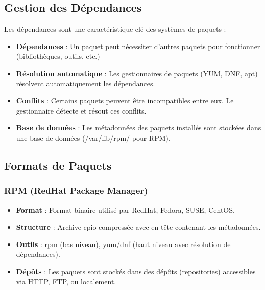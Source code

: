 \documentclass[12pt,a4paper]{article}
\begin{document}
\subsection{Gestion des Dépendances}

Les dépendances sont une caractéristique clé des systèmes de paquets :

\begin{itemize}
    \item \textbf{Dépendances} : Un paquet peut nécessiter d'autres paquets pour fonctionner (bibliothèques, outils, etc.)
    
    \item \textbf{Résolution automatique} : Les gestionnaires de paquets (YUM, DNF, apt) résolvent automatiquement les dépendances.
    
    \item \textbf{Conflits} : Certains paquets peuvent être incompatibles entre eux. Le gestionnaire détecte et résout ces conflits.
    
    \item \textbf{Base de données} : Les métadonnées des paquets installés sont stockées dans une base de données (/var/lib/rpm/ pour RPM).
\end{itemize}

\subsection{Formats de Paquets}

\subsubsection{RPM (RedHat Package Manager)}

\begin{itemize}
    \item \textbf{Format} : Format binaire utilisé par RedHat, Fedora, SUSE, CentOS.
    
    \item \textbf{Structure} : Archive cpio compressée avec en-tête contenant les métadonnées.
    
    \item \textbf{Outils} : rpm (bas niveau), yum/dnf (haut niveau avec résolution de dépendances).
    
    \item \textbf{Dépôts} : Les paquets sont stockés dans des dépôts (repositories) accessibles via HTTP, FTP, ou localement.
\end{itemize}
\end{document}
